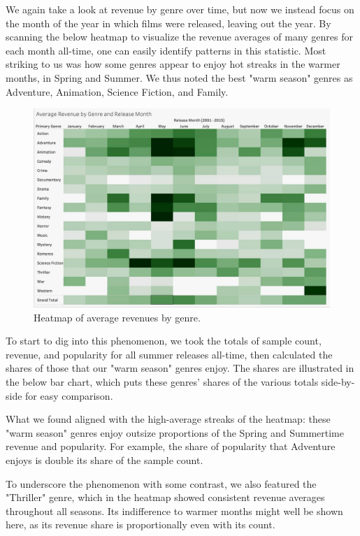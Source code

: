 \documentclass[12pt]{article}
\begin{document}
We again take a look at revenue by genre over time, but now we instead focus on the month of the year in which films were released, leaving out the year. By scanning the below heatmap to visualize the revenue averages of many genres for each month all-time, one can easily identify patterns in this statistic. Most striking to us was how some genres appear to enjoy hot streaks in the warmer months, in Spring and Summer. We thus noted the best "warm season" genres as Adventure, Animation, Science Fiction, and Family.

\begin{figure}[h!]
    \centering
    \includegraphics[width=1\textwidth]{images/final_drafts/heatmap - avg rev.jpg}
    \caption{Heatmap of average revenues by genre.}
    \label{fig:figure_3}
\end{figure}

To start to dig into this phenomenon, we took the totals of sample count, revenue, and popularity for all summer releases all-time, then calculated the shares of those that our "warm season" genres enjoy. The shares are illustrated in the below bar chart, which puts these genres' shares of the various totals side-by-side for easy comparison.

What we found aligned with the high-average streaks of the heatmap: these "warm season" genres enjoy outsize proportions of the Spring and Summertime revenue and popularity. For example, the share of popularity that Adventure enjoys is double its share of the sample count.

To underscore the phenomenon with some contrast, we also featured the "Thriller" genre, which in the heatmap showed consistent revenue averages throughout all seasons. Its indifference to warmer months might well be shown here, as its revenue share is proportionally even with its count.
\end{document}
